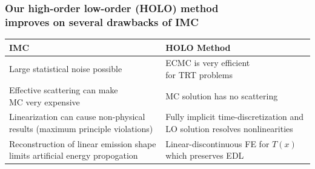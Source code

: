 \documentclass[xcolor=dvipsnames,hyperref={pdfpagelabels=false},unknownkeysallowed]{beamer}
\newcommand{\colb}[1]{{\color{blue} #1}}
\newcommand{\colG}[1]{{\color{Gray!110} #1}}
\newcommand{\colr}[1]{{\color{red} #1}}
\newlength{\tabsep}
\begin{document}
\begin{frame}
    \frametitle{\colb{Our high-order low-order (HOLO) method \\improves on several drawbacks of IMC}}
    \begin{center}
{\footnotesize
\begin{tabular}{p{} p{}} 
    \multicolumn{1}{l}{\textbf{\normalsize  IMC}} & \multicolumn{1}{l}{\textbf{\normalsize
    HOLO Method}} \\ \hline [2pt]
    \parbox{0.4\textwidth}{Large \colr{statistical noise} possible} & 
    \parbox{0.4\textwidth}{ECMC is very efficient \\for TRT problems} \\ [\tabsep]
 \parbox{0.4\textwidth}{{\color{red}Effective scattering} can make \\ MC  very expensive}
 & \parbox{0.4\textwidth}{MC solution has \colb{no
 scattering}} \\[\tabsep] 
 \parbox{0.5\textwidth}{Linearization can cause \colr{non-physical}\\ results  (maximum principle
 violations)} & \parbox{0.5\textwidth}{Fully \colb{implicit} time-discretization
 and LO solution \colb{resolves nonlinearities}} \\[\tabsep] 
 \parbox{0.5\textwidth}{\colG{Reconstruction of linear emission shape limits artificial energy propogation}} &
 \parbox{0.5\textwidth}{Linear-discontinuous FE for $T(x)$ \\ which preserves EDL} 
\end{tabular}
}
\end{center}
\end{frame}
\end{document}
